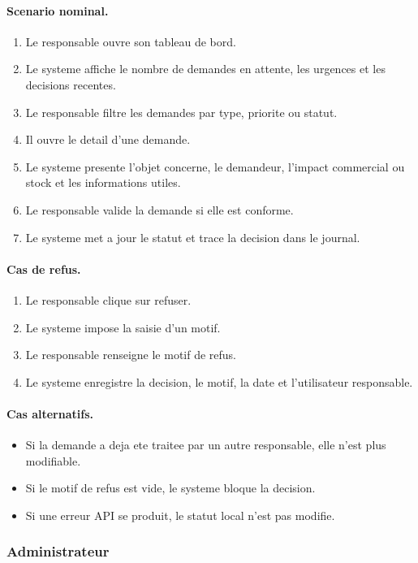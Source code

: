 \paragraph{Scenario nominal.}
\begin{enumerate}
  \item Le responsable ouvre son tableau de bord.
  \item Le systeme affiche le nombre de demandes en attente, les urgences et les decisions recentes.
  \item Le responsable filtre les demandes par type, priorite ou statut.
  \item Il ouvre le detail d'une demande.
  \item Le systeme presente l'objet concerne, le demandeur, l'impact commercial ou stock et les informations utiles.
  \item Le responsable valide la demande si elle est conforme.
  \item Le systeme met a jour le statut et trace la decision dans le journal.
\end{enumerate}

\paragraph{Cas de refus.}
\begin{enumerate}
  \item Le responsable clique sur refuser.
  \item Le systeme impose la saisie d'un motif.
  \item Le responsable renseigne le motif de refus.
  \item Le systeme enregistre la decision, le motif, la date et l'utilisateur responsable.
\end{enumerate}

\paragraph{Cas alternatifs.}
\begin{itemize}
  \item Si la demande a deja ete traitee par un autre responsable, elle n'est plus modifiable.
  \item Si le motif de refus est vide, le systeme bloque la decision.
  \item Si une erreur API se produit, le statut local n'est pas modifie.
\end{itemize}

\subsubsection{Administrateur}

